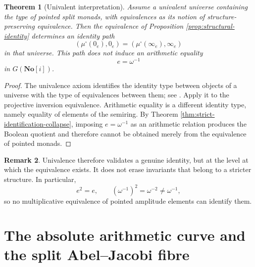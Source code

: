 \documentclass[11pt]{amsart}
\numberwithin{equation}{section}
\newtheorem{theorem}{Theorem}[section]
\theoremstyle{definition}
\newtheorem{remark}[theorem]{Remark}
\newcommand{\No}{\mathbf{No}}
\begin{document}
\begin{theorem}[Univalent interpretation]\label{thm:univalent-interpretation}
Assume a univalent universe containing the type of pointed split monads, with equivalences as its notion of structure-preserving equivalence.  Then the equivalence of Proposition \ref{prop:structural-identity} determines an identity path
\[
(\mu^\square(0_e),0_e)
=
(\mu^\square(\infty_e),\infty_e)
\]
in that universe.  This path does not induce an arithmetic equality
\[
e=\omega^{-1}
\]
in $G(\No[i])$.
\end{theorem}

\begin{proof}
The univalence axiom identifies the identity type between objects of a universe with the type of equivalences between them; see \cite{HoTT}.  Apply it to the projective inversion equivalence.  Arithmetic equality is a different identity type, namely equality of elements of the semiring.  By Theorem \ref{thm:strict-identification-collapse}, imposing $e=\omega^{-1}$ as an arithmetic relation produces the Boolean quotient and therefore cannot be obtained merely from the equivalence of pointed monads.
\end{proof}

\begin{remark}
Univalence therefore validates a genuine identity, but at the level at which the equivalence exists.  It does not erase invariants that belong to a stricter structure.  In particular,
\[
e^2=e,
\qquad
(\omega^{-1})^2=\omega^{-2}\neq\omega^{-1},
\]
so no multiplicative equivalence of pointed amplitude elements can identify them.
\end{remark}

\section{The absolute arithmetic curve and the split Abel--Jacobi fibre}
\label{sec:absolute-curve}
\end{document}
